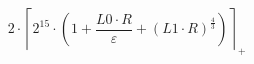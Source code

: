 \[2 \cdot \left\lceil 2^{15} \cdot \left(1 + \frac{L0 \cdot R}{\varepsilon} + \left(L1 \cdot R\right)^{\frac{4}{3}}\right) \right\rceil_{+}\]

